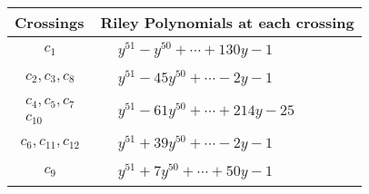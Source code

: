 \documentclass[1p]{elsarticle_modified}
\theoremstyle{definition}
\begin{document}
\begin{tabular}{m{50pt}|m{274pt}}
Crossings & \hspace{64pt}Riley Polynomials at each crossing \\
\hline $$\begin{aligned}c_{1}\end{aligned}$$&$\begin{aligned}
&y^{51}- y^{50}+\cdots+130 y-1
\end{aligned}$\\
\hline $$\begin{aligned}c_{2},c_{3},c_{8}\end{aligned}$$&$\begin{aligned}
&y^{51}-45 y^{50}+\cdots-2 y-1
\end{aligned}$\\
\hline $$\begin{aligned}c_{4},c_{5},c_{7}\\c_{10}\end{aligned}$$&$\begin{aligned}
&y^{51}-61 y^{50}+\cdots+214 y-25
\end{aligned}$\\
\hline $$\begin{aligned}c_{6},c_{11},c_{12}\end{aligned}$$&$\begin{aligned}
&y^{51}+39 y^{50}+\cdots-2 y-1
\end{aligned}$\\
\hline $$\begin{aligned}c_{9}\end{aligned}$$&$\begin{aligned}
&y^{51}+7 y^{50}+\cdots+50 y-1
\end{aligned}$\\
\hline
\end{tabular}
\vskip 2pc
\end{document}
